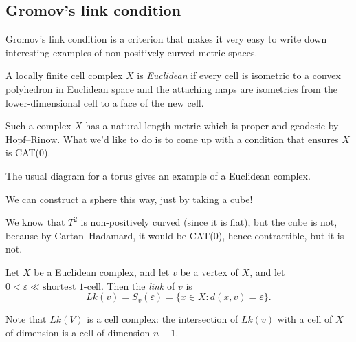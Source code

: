 \documentclass[a4paper]{article}
\begin{document}
\subsection{Gromov's link condition}
Gromov's link condition is a criterion that makes it very easy to write down interesting examples of non-positively-curved metric spaces.

\begin{defi}
  A locally finite cell complex $X$ is \emph{Euclidean} if every cell is isometric to a convex polyhedron in Euclidean space and the attaching maps are isometries from the lower-dimensional cell to a face of the new cell.
\end{defi}
Such a complex $X$ has a natural length metric which is proper and geodesic by Hopf--Rinow. What we'd like to do is to come up with a condition that ensures $X$ is CAT(0).

\begin{eg}
  The usual diagram for a torus gives an example of a Euclidean complex.
  \begin{center}
  \end{center}
\end{eg}

\begin{eg}
  We can construct a sphere this way, just by taking a cube!
\end{eg}
We know that $T^2$ is non-positively curved (since it is flat), but the cube is not, because by Cartan--Hadamard, it would be CAT(0), hence contractible, but it is not.

\begin{defi}[Link]
  Let $X$ be a Euclidean complex, and let $v$ be a vertex of $X$, and let $0 < \varepsilon \ll \text{shortest $1$-cell}$. Then the \emph{link} of $v$ is
  \[
    Lk(v) = S_v(\varepsilon) = \{x \in X: d(x, v) = \varepsilon\}.
  \]
\end{defi}
Note that $Lk(V)$ is a cell complex: the intersection of $Lk(v)$ with a cell of $X$ of dimension is a cell of dimension $n - 1$.
\end{document}
